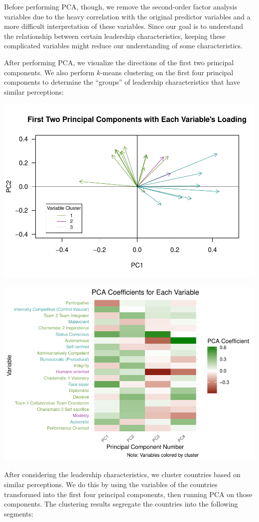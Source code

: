 \documentclass[
]{article}
\begin{document}
Before performing PCA, though, we remove the second-order factor
analysis variables due to the heavy correlation with the original
predictor variables and a more difficult interpretation of these
variables. Since our goal is to understand the relationship between
certain leadership characteristics, keeping these complicated variables
might reduce our understanding of some characteristics.

After performing PCA, we visualize the directions of the first two
principal components. We also perform \(k\)-means clustering on the
first four principal components to determine the ``groups'' of
leadership characteristics that have similar perceptions:

\begin{center}\includegraphics[width=0.7\linewidth]{final_report_files/figure-latex/unnamed-chunk-3-1} \end{center}

\begin{center}\includegraphics[width=0.85\linewidth]{final_report_files/figure-latex/unnamed-chunk-4-1} \end{center}

After considering the leadership characteristics, we cluster countries
based on similar perceptions. We do this by using the variables of the
countries transformed into the first four principal components, then
running PCA on those components. The clustering results segregate the
countries into the following segments:
\end{document}
